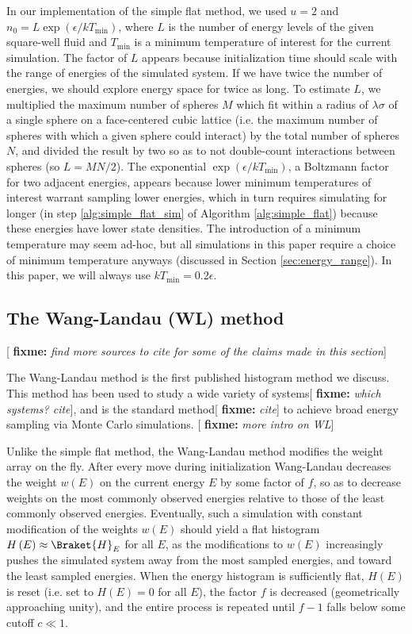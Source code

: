 \documentclass[11pt]{article}
\newcommand{\bk}{\Braket} %
\renewcommand{\t}{\text} %
\newcommand{\p}[1]{\left(#1\right)} %
\newcommand{\red}[1]{{\bf \color{red} #1}}
\newcommand{\fixme}[1]{[\red{fixme:} \emph{#1}]}
\begin{document}
In our implementation of the simple flat method, we used $u=2$ and
$n_0=L\exp\p{\epsilon/kT_{\t{min}}}$, where $L$ is the number of
energy levels of the given square-well fluid and $T_{\t{min}}$ is a
minimum temperature of interest for the current simulation. The factor
of $L$ appears because initialization time should scale with the range
of energies of the simulated system. If we have twice the number of
energies, we should explore energy space for twice as long. To
estimate $L$, we multiplied the maximum number of spheres $M$ which
fit within a radius of $\lambda\sigma$ of a single sphere on a
face-centered cubic lattice (i.e. the maximum number of spheres with
which a given sphere could interact) by the total number of spheres
$N$, and divided the result by two so as to not double-count
interactions between spheres (so $L=MN/2$). The exponential
$\exp\p{\epsilon/kT_{\t{min}}}$, a Boltzmann factor for two adjacent
energies, appears because lower minimum temperatures of interest
warrant sampling lower energies, which in turn requires simulating for
longer (in step \ref{alg:simple_flat_sim} of Algorithm
\ref{alg:simple_flat}) because these energies have lower state
densities. The introduction of a minimum temperature may seem ad-hoc,
but all simulations in this paper require a choice of minimum
temperature anyways (discussed in Section \ref{sec:energy_range}). In
this paper, we will always use $kT_{\t{min}}=0.2\epsilon$.

\subsection{The Wang-Landau (WL) method}
\label{sec:wang_landau}

\fixme{find more sources to cite for some of the claims made in this
  section}

The Wang-Landau method is the first published histogram method we
discuss\cite{wang_landau, wang_landau_mod, wang_landau_analysis}. This
method has been used to study a wide variety of systems\fixme{which
  systems? cite}, and is the standard method\fixme{cite} to achieve
broad energy sampling via Monte Carlo simulations. \fixme{more intro
  on WL}

Unlike the simple flat method, the Wang-Landau method modifies the
weight array on the fly. After every move during initialization
Wang-Landau decreases the weight $w\p{E}$ on the current energy $E$ by
some factor of $f$, so as to decrease weights on the most commonly
observed energies relative to those of the least commonly observed
energies. Eventually, such a simulation with constant modification of
the weights $w\p{E}$ should yield a flat histogram
$H\p{E}\approx\bk{H}_E$ for all $E$, as the modifications to $w\p{E}$
increasingly pushes the simulated system away from the most sampled
energies, and toward the least sampled energies. When the energy
histogram is sufficiently flat, $H\p{E}$ is reset (i.e. set to
$H\p{E}=0$ for all $E$), the factor $f$ is decreased (geometrically
approaching unity), and the entire process is repeated until $f-1$
falls below some cutoff $c\ll 1$.
\end{document}
